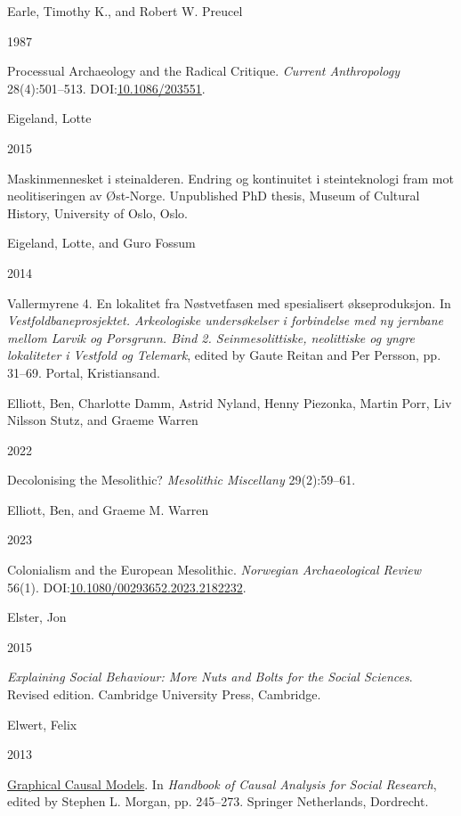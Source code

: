 \documentclass[
  12pt,
  a4paper,
  oneside]{book}
\newlength{\cslhangindent}
\newlength{\csllabelwidth}
\newlength{\cslentryspacingunit} %
\newenvironment{CSLReferences}[2] %
 {%
  \setlength{\parindent}{0pt}
  \ifodd #1
  \let\oldpar\par
  \def\par{\hangindent=\cslhangindent\oldpar}
  \fi
  \setlength{\parskip}{#2\cslentryspacingunit}
 }%
 {}
\newcommand{\CSLBlock}[1]{#1\hfill\break}
\newcommand{\CSLLeftMargin}[1]{\parbox[t]{\csllabelwidth}{#1}}
\newcommand{\CSLRightInline}[1]{\parbox[t]{\linewidth - \csllabelwidth}{#1}\break}
\begin{document}
\begin{CSLReferences}{0}{0}
\leavevmode{}%
\CSLBlock{Earle, Timothy K., and Robert W. Preucel}
\CSLLeftMargin{ 1987}%
\CSLRightInline{{Processual Archaeology and the Radical Critique}. \emph{Current Anthropology} 28(4):501--513. DOI:\href{https://doi.org/10.1086/203551}{10.1086/203551}.}

\leavevmode{}%
\CSLBlock{Eigeland, Lotte}
\CSLLeftMargin{ 2015}%
\CSLRightInline{{Maskinmennesket i steinalderen. Endring og kontinuitet i steinteknologi fram mot neolitiseringen av Øst-Norge}. Unpublished PhD thesis, Museum of Cultural History, University of Oslo, Oslo.}

\leavevmode{}%
\CSLBlock{Eigeland, Lotte, and Guro Fossum}
\CSLLeftMargin{ 2014}%
\CSLRightInline{{Vallermyrene 4. En lokalitet fra Nøstvetfasen med spesialisert økseproduksjon}. In \emph{{Vestfoldbaneprosjektet. Arkeologiske undersøkelser i forbindelse med ny jernbane mellom Larvik og Porsgrunn. Bind 2. Seinmesolittiske, neolittiske og yngre lokaliteter i Vestfold og Telemark}}, edited by Gaute Reitan and Per Persson, pp. 31--69. Portal, Kristiansand.}

\leavevmode{}%
\CSLBlock{Elliott, Ben, Charlotte Damm, Astrid Nyland, Henny Piezonka, Martin Porr, Liv Nilsson Stutz, and Graeme Warren}
\CSLLeftMargin{ 2022}%
\CSLRightInline{{Decolonising the Mesolithic?} \emph{Mesolithic Miscellany} 29(2):59--61.}

\leavevmode{}%
\CSLBlock{Elliott, Ben, and Graeme M. Warren}
\CSLLeftMargin{ 2023}%
\CSLRightInline{{Colonialism and the European Mesolithic}. \emph{Norwegian Archaeological Review} 56(1). DOI:\href{https://doi.org/10.1080/00293652.2023.2182232}{10.1080/00293652.2023.2182232}.}

\leavevmode{}%
\CSLBlock{Elster, Jon}
\CSLLeftMargin{ 2015}%
\CSLRightInline{\emph{{Explaining Social Behaviour: More Nuts and Bolts for the Social Sciences}}. Revised edition. Cambridge University Press, Cambridge.}

\leavevmode{}%
\CSLBlock{Elwert, Felix}
\CSLLeftMargin{ 2013}%
\CSLRightInline{\href{https://doi.org/10.1007/978-94-007-6094-3_13}{{Graphical Causal Models}}. In \emph{{Handbook of Causal Analysis for Social Research}}, edited by Stephen L. Morgan, pp. 245--273. Springer Netherlands, Dordrecht.}


\end{CSLReferences}
\end{document}
